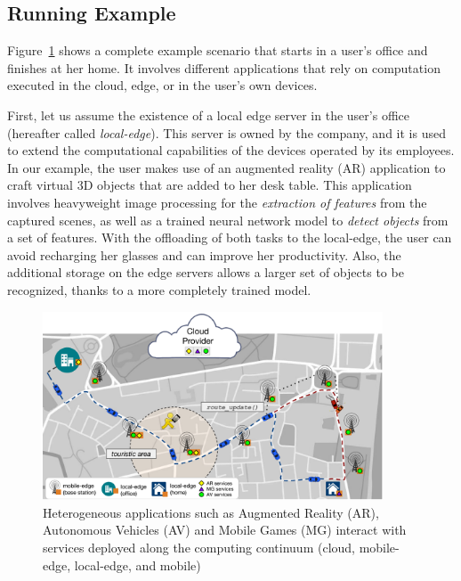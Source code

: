 \subsection{Running Example}
\label{sub:example}

Figure~\ref{fig:continuum-scenario} shows a complete example scenario that starts in a user's office and finishes at her home. It involves different applications that rely on computation executed in the cloud, edge, or in the user's own devices. 

First, let us assume the existence of a local edge server in the user's office (hereafter called \textit{local-edge}). This server is owned by the company, and it is used to extend the computational capabilities of the devices operated by its employees. In our example, the user makes use of an augmented reality (AR) application to craft virtual 3D objects that are added to her desk table. This application involves heavyweight image processing for the \textit{extraction of features} from the captured scenes, as well as a trained neural network model to \textit{detect objects} from a set of features. With the offloading of both tasks to the local-edge, the user can avoid recharging her glasses and can improve her productivity. Also, the additional storage on the edge servers allows a larger set of objects to be recognized, thanks to a more completely trained model.

\begin{figure}[tbp]
	\includegraphics[width=0.9\textwidth]{figs/Continuum-Scenario}
	\caption{Heterogeneous applications such as Augmented Reality (AR), Autonomous Vehicles (AV) and Mobile Games (MG) interact with services deployed along the computing continuum (cloud, mobile-edge, local-edge, and mobile)}
	\label{fig:continuum-scenario}
\end{figure}

